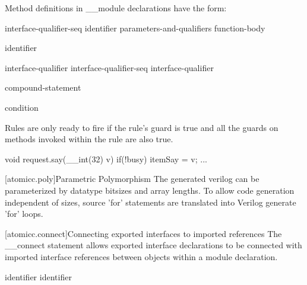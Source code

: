 \pnum
Method definitions in __module declarations have the form:

\begin{bnf}
\br
     interface-qualifier-seq identifier parameters-and-qualifiers function-body
\end{bnf}

\begin{bnf}
\br
    identifier 

 \br
    interface-qualifier \br
    interface-qualifier-seq interface-qualifier
\end{bnf}

\begin{bnf}
\br
     compound-statement

\br
     condition \terminal{)}

\end{bnf}


Rules are only ready to fire if the rule's guard is true and all the
guards on methods invoked within the rule are also true.

\begin{codeblock}
         void request.say(__int(32) v) if(!busy) {
             itemSay = v;
             ...
         }
\end{codeblock}

[atomicc.poly]{Parametric Polymorphism}
The generated verilog can be parameterized by datatype bitsizes and array lengths.
To allow code generation independent of sizes,
source 'for' statements are translated into
Verilog generate 'for' loops.

[atomicc.connect]{Connecting exported interfaces to imported references}
The __connect statement allows exported interface declarations to be connected
with imported interface references between objects within a module declaration.

\begin{bnf}
\br
     identifier \terminal{=} identifier \terminal{;}
\end{bnf}

